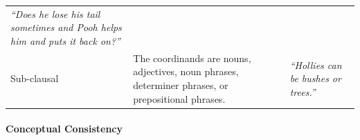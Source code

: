 \documentclass[oneside]{report}
\theoremstyle{definition}
\theoremstyle{definition}
\theoremstyle{definition}
\theoremstyle{remark}
\begin{document}
\begin{longtable}[]{@{}lll@{}}
\begin{minipage}[t]{0.37\columnwidth}
\emph{``Does he lose his tail sometimes and Pooh helps him and puts it
back on?''}\strut
\end{minipage}\tabularnewline
\begin{minipage}[t]{0.17\columnwidth}\raggedright\strut
Sub-clausal\strut
\end{minipage} & \begin{minipage}[t]{0.37\columnwidth}\raggedright\strut
The coordinands are nouns, adjectives, noun phrases, determiner phrases,
or prepositional phrases.\strut
\end{minipage} & \begin{minipage}[t]{0.37\columnwidth}\raggedright\strut
\emph{``Hollies can be bushes or trees.''}\strut
\end{minipage}\tabularnewline
\bottomrule
\end{longtable}
\paragraph{Conceptual Consistency}\label{conceptual-consistency}
\end{document}

